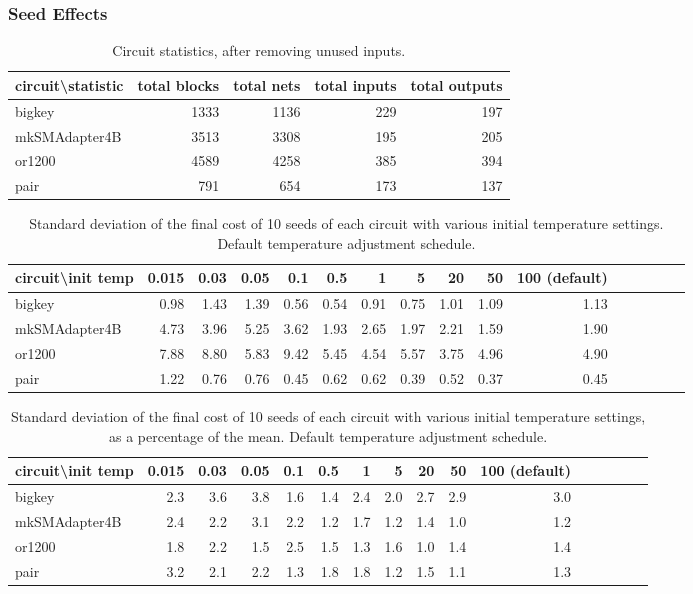 \documentclass[11pt]{article}
\begin{document}
\subsubsection{Seed Effects}

\begin{table} \centering
\begin{tabular}{l | *4r}
\hline\hline
circuit\textbackslash statistic & total blocks & total nets & total inputs & total outputs \\
\hline
bigkey & 1333 & 1136 & 229 & 197 \\
mkSMAdapter4B & 3513 & 3308 & 195 & 205 \\
or1200 & 4589 & 4258 & 385 & 394 \\
pair   & 791  &  654 & 173 & 137 \\
\hline\hline
\end{tabular}
\caption{Circuit statistics, after removing unused inputs.}
\label{tab:circuit-stats}
\end{table}

\begin{table}
\centering
\begin{tabular}{l | *{15}r}
\hline\hline
circuit\textbackslash init temp & 0.015 & 0.03 & 0.05 & 0.1 & 0.5 & 1 & 5 & 20 & 50 & 100 (default)\\
\hline
bigkey & 0.98 & 1.43 & 1.39 & 0.56 & 0.54 & 0.91 & 0.75 & 1.01 & 1.09 & 1.13 \\
mkSMAdapter4B & 4.73 & 3.96 & 5.25 & 3.62 & 1.93 & 2.65 & 1.97 & 2.21 & 1.59 & 1.90 \\
or1200 & 7.88 & 8.80 & 5.83 & 9.42 & 5.45 & 4.54 & 5.57 & 3.75 & 4.96 & 4.90 \\
pair & 1.22 & 0.76 & 0.76 & 0.45 & 0.62 & 0.62 & 0.39 & 0.52 & 0.37 & 0.45 \\
\hline\hline
\end{tabular}
\caption{Standard deviation of the final cost of 10 seeds of each circuit with various initial temperature settings. Default temperature adjustment schedule. }
\label{tab:stddev-by-temp}
\end{table}

\begin{table}
\centering
\begin{tabular}{l | *{15}r}
\hline\hline
circuit\textbackslash init temp & 0.015 & 0.03 & 0.05 & 0.1 & 0.5 & 1 & 5 & 20 & 50 & 100 (default)\\
\hline
bigkey & 2.3 & 3.6 & 3.8 & 1.6 & 1.4 & 2.4 & 2.0 & 2.7 & 2.9 & 3.0 \\
mkSMAdapter4B & 2.4 & 2.2 & 3.1 & 2.2 & 1.2 & 1.7 & 1.2 & 1.4 & 1.0 & 1.2 \\
or1200 & 1.8 & 2.2 & 1.5 & 2.5 & 1.5 & 1.3 & 1.6 & 1.0 & 1.4 & 1.4 \\
pair & 3.2 & 2.1 & 2.2 & 1.3 & 1.8 & 1.8 & 1.2 & 1.5 & 1.1 & 1.3 \\
\hline\hline
\end{tabular}
\caption{Standard deviation of the final cost of 10 seeds of each circuit with various initial temperature settings, as a percentage of the mean. Default temperature adjustment schedule. }
\label{tab:stddev-by-temp-as-percent}
\end{table}
\end{document}
